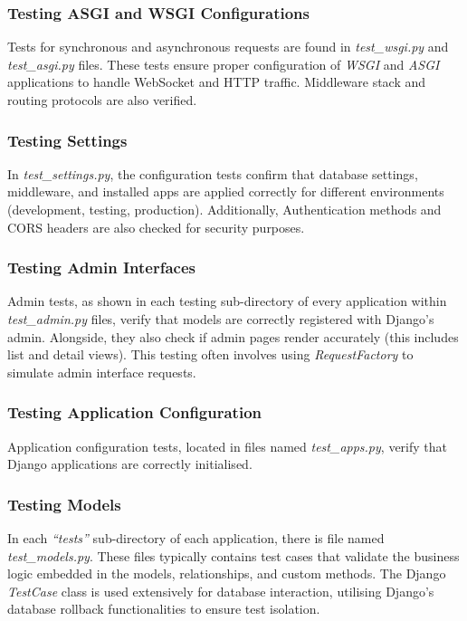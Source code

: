 \subsubsection{Testing ASGI and WSGI Configurations}

Tests for synchronous and asynchronous requests are found in \textit{test\_wsgi.py} and \textit{test\_asgi.py} files. These tests ensure proper configuration of \textit{WSGI} and \textit{ASGI} applications to handle WebSocket and HTTP traffic. Middleware stack and routing protocols are also verified.

\subsubsection{Testing Settings}

In \textit{test\_settings.py}, the configuration tests confirm that database settings, middleware, and installed apps are applied correctly for different environments (development, testing, production). Additionally, Authentication methods and CORS headers are also checked for security purposes. 

\subsubsection{Testing Admin Interfaces}

Admin tests, as shown in each testing sub-directory of every application within \textit{test\_admin.py} files, verify that models are correctly registered with Django's admin. Alongside, they also check if admin pages render accurately (this includes list and detail views). This testing often involves using \textit{RequestFactory} to simulate admin interface requests.

\subsubsection{Testing Application Configuration}

Application configuration tests, located in files named \textit{test\_apps.py}, verify that Django applications are correctly initialised.

\subsubsection{Testing Models}

In each \textit{``tests''} sub-directory of each application, there is file named \textit{test\_models.py}. These files typically contains test cases that validate the business logic embedded in the models, relationships, and custom methods. The Django \textit{TestCase} class is used extensively for database interaction, utilising Django's database rollback functionalities to ensure test isolation.

